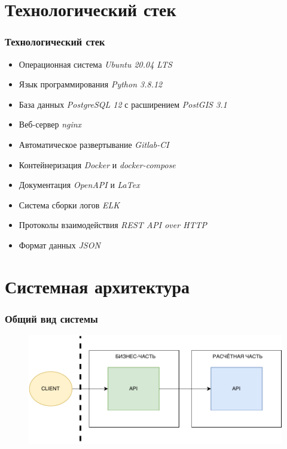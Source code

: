 \section{Технологический стек}
%

\begin{frame}
\frametitle{Технологический стек}
\begin{itemize}
    \item Операционная система \textit{Ubuntu 20.04 LTS}
    \item Язык программирования \textit{Python 3.8.12}
    \item База данных \textit{PostgreSQL 12} с расширением \textit{PostGIS 3.1}
    \item Веб-сервер \textit{nginx}
    \item Автоматическое развертывание \textit{Gitlab-CI}
    \item Контейнеризация \textit{Docker} и \textit{docker-compose}
    \item Документация \textit{OpenAPI} и \textit{LaTex}
    \item Система сборки логов \textit{ELK}
    \item Протоколы взаимодействия \textit{REST API over HTTP}
    \item Формат данных \textit{JSON}
\end{itemize}
\end{frame}


\section{Системная архитектура}

\begin{frame}
\frametitle{Общий вид системы}
\begin{figure}
    \includegraphics[scale=.9]{pictures/architecture/system}
\end{figure}
\end{frame}


